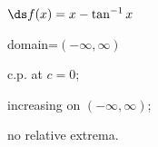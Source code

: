 {$\ds f(x) =x-\tan^{-1} x$
}
{domain=$(-\infty,\infty)$

c.p. at $c=0$; 

increasing on $(-\infty,\infty)$;

no relative extrema.
}
